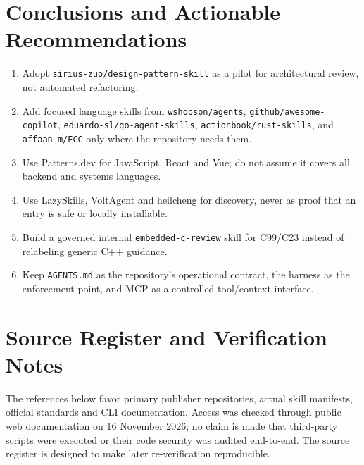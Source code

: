 \documentclass[11pt,letterpaper]{article}
\begin{document}
\section{Conclusions and Actionable Recommendations}
\begin{insight}
\begin{enumerate}
\item Adopt \texttt{sirius-zuo/design-pattern-skill} as a pilot for architectural review, not automated refactoring.
\item Add focused language skills from \texttt{wshobson/agents}, \texttt{github/awesome-copilot}, \texttt{eduardo-sl/go-agent-skills}, \texttt{actionbook/rust-skills}, and \texttt{affaan-m/ECC} only where the repository needs them.
\item Use Patterns.dev for JavaScript, React and Vue; do not assume it covers all backend and systems languages.
\item Use LazySkills, VoltAgent and heilcheng for discovery, never as proof that an entry is safe or locally installable.
\item Build a governed internal \texttt{embedded-c-review} skill for C99/C23 instead of relabeling generic C++ guidance.
\item Keep \texttt{AGENTS.md} as the repository's operational contract, the harness as the enforcement point, and MCP as a controlled tool/context interface.
\end{enumerate}
\end{insight}

\newpage
\section{Source Register and Verification Notes}
The references below favor primary publisher repositories, actual skill manifests, official standards and CLI documentation. Access was checked through public web documentation on 16 November 2026; no claim is made that third-party scripts were executed or their code security was audited end-to-end. The source register is designed to make later re-verification reproducible.
\end{document}
